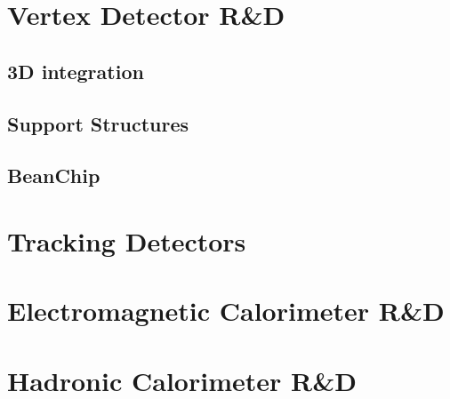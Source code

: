 \documentclass[10pt]{article}
\begin{document}
\section{Vertex Detector R\&D}


\subsection{3D integration}



\subsection{Support Structures}
\subsection{BeanChip}

\section{Tracking Detectors}



\section{Electromagnetic Calorimeter R\&D}


\section{Hadronic Calorimeter R\&D}


\end{document}
